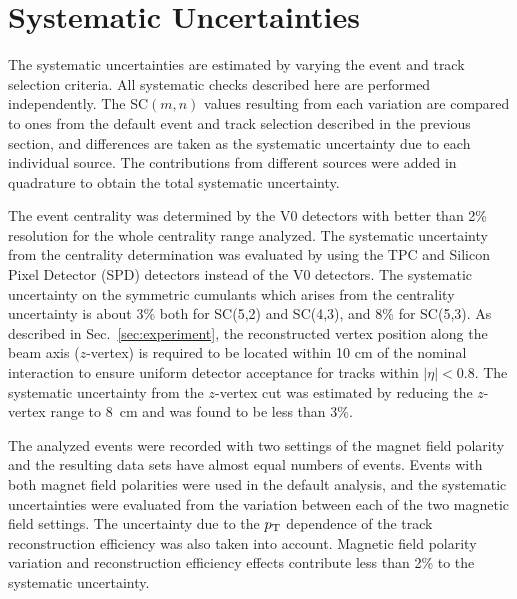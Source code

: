 \section{Systematic Uncertainties}
\label{sec:uncertainties}
The systematic uncertainties are estimated by varying the event and track selection criteria. All systematic checks described here are performed independently. 
The SC$(m,n)$ values resulting from each variation are compared to ones from the default event and track selection described in the previous section,
and differences are taken as the systematic uncertainty due to each individual source.
The contributions from different sources were added in quadrature to obtain the total systematic uncertainty.

The event centrality was determined by the V0 detectors \cite{Abbas:2013taa} with better than 2\%  resolution for the whole centrality range analyzed. The systematic uncertainty from the centrality determination was evaluated by using the TPC and Silicon Pixel Detector (SPD) \cite{Dellacasa:1999kf} detectors instead of the V0 detectors. 
The systematic uncertainty on the symmetric cumulants which arises from the centrality uncertainty is about 3\% both for SC(5,2) and SC(4,3), and 8\% for  SC(5,3).
As described in Sec.~\ref{sec:experiment}, the reconstructed vertex position along the beam axis ($z$-vertex) is required to be located within 10 cm of the nominal interaction to ensure uniform detector acceptance for tracks within $|\eta|<0.8$. The systematic uncertainty from the $z$-vertex cut was estimated by reducing the $z$-vertex range to 8~cm and was found to be less than 3\%.  

The analyzed events were recorded with two settings of the magnet field polarity and the resulting data sets have almost equal numbers of events. Events with both magnet field polarities were used in the default analysis, and the systematic uncertainties were evaluated from the variation between each of the two magnetic field settings. 
The uncertainty due to the $p_{\rm T}$ dependence of the track reconstruction efficiency was also taken into account.
Magnetic field polarity variation and reconstruction efficiency effects contribute less than 2\% to the systematic uncertainty.

